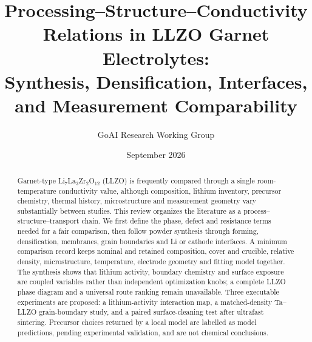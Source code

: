 \documentclass[11pt]{article}
\title{Processing--Structure--Conductivity Relations in LLZO Garnet Electrolytes: \\
Synthesis, Densification, Interfaces, and Measurement Comparability}
\author{GoAI Research Working Group}
\date{September 2026}
\begin{document}
\maketitle

\begin{abstract}
Garnet-type Li$_7$La$_3$Zr$_2$O$_{12}$ (LLZO) is frequently compared through a single room-temperature conductivity value, although composition, lithium inventory, precursor chemistry, thermal history, microstructure and measurement geometry vary substantially between studies. This review organizes the literature as a process--structure--transport chain. We first define the phase, defect and resistance terms needed for a fair comparison, then follow powder synthesis through forming, densification, membranes, grain boundaries and Li or cathode interfaces. A minimum comparison record keeps nominal and retained composition, cover and crucible, relative density, microstructure, temperature, electrode geometry and fitting model together. The synthesis shows that lithium activity, boundary chemistry and surface exposure are coupled variables rather than independent optimization knobs; a complete LLZO phase diagram and a universal route ranking remain unavailable. Three executable experiments are proposed: a lithium-activity interaction map, a matched-density Ta--LLZO grain-boundary study, and a paired surface-cleaning test after ultrafast sintering. Precursor choices returned by a local model are labelled as model predictions, pending experimental validation, and are not chemical conclusions.
\end{abstract}












\clearpage


\end{document}
